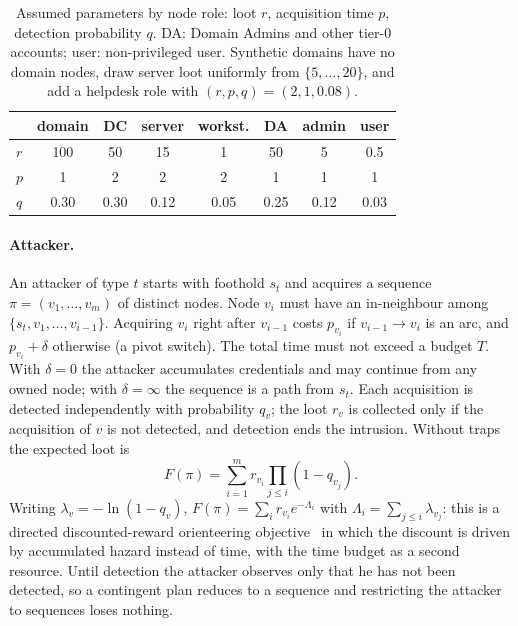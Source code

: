 \documentclass[runningheads]{llncs}
\begin{document}
\begin{table}[t]
\centering
\caption{Assumed parameters by node role: loot $r$, acquisition time $p$, detection probability $q$. DA: Domain Admins and other tier-0 accounts; user: non-privileged user. Synthetic domains have no domain nodes, draw server loot uniformly from $\{5,\dots,20\}$, and add a helpdesk role with $(r,p,q)=(2,1,0.08)$.}\label{tab:valuation}
\small\setlength{\tabcolsep}{8pt}
\begin{tabular}{lccccccc}
\toprule
 & domain & DC & server & workst. & DA & admin & user\\
\midrule
$r$ & 100 & 50 & 15 & 1 & 50 & 5 & 0.5\\
$p$ & 1 & 2 & 2 & 2 & 1 & 1 & 1\\
$q$ & 0.30 & 0.30 & 0.12 & 0.05 & 0.25 & 0.12 & 0.03\\
\bottomrule
\end{tabular}
\end{table}

\paragraph{Attacker.}
An attacker of type $t$ starts with foothold $s_t$ and acquires a sequence $\pi=(v_1,\dots,v_m)$ of distinct nodes. Node $v_i$ must have an in-neighbour among $\{s_t,v_1,\dots,v_{i-1}\}$. Acquiring $v_i$ right after $v_{i-1}$ costs $p_{v_i}$ if $v_{i-1}\to v_i$ is an arc, and $p_{v_i}+\delta$ otherwise (a pivot switch). The total time must not exceed a budget $T$. With $\delta=0$ the attacker accumulates credentials and may continue from any owned node; with $\delta=\infty$ the sequence is a path from $s_t$. Each acquisition is detected independently with probability $q_v$; the loot $r_v$ is collected only if the acquisition of $v$ is not detected, and detection ends the intrusion. Without traps the expected loot is
\begin{equation}\label{eq:F}
F(\pi)=\sum_{i=1}^{m} r_{v_i}\prod_{j\le i}(1-q_{v_j}).
\end{equation}
Writing $\lambda_v=-\ln(1-q_v)$, $F(\pi)=\sum_i r_{v_i}e^{-\Lambda_i}$ with $\Lambda_i=\sum_{j\le i}\lambda_{v_j}$: this is a directed discounted-reward orienteering objective~\cite{blum2007orienteering} in which the discount is driven by accumulated hazard instead of time, with the time budget as a second resource. Until detection the attacker observes only that he has not been detected, so a contingent plan reduces to a sequence and restricting the attacker to sequences loses nothing.
\end{document}
